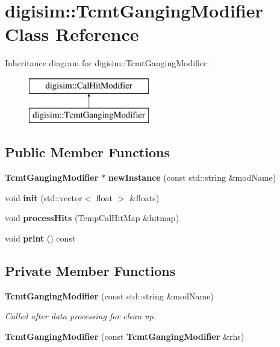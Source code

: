 \section{digisim\-:\-:Tcmt\-Ganging\-Modifier Class Reference}
\label{classdigisim_1_1TcmtGangingModifier}
Inheritance diagram for digisim\-:\-:Tcmt\-Ganging\-Modifier\-:\begin{figure}[H]
\begin{center}
\leavevmode
\includegraphics[height=2.000000cm]{classdigisim_1_1TcmtGangingModifier}
\end{center}
\end{figure}
\subsection*{Public Member Functions}
\begin{DoxyCompactItemize}
\item 
{\bf Tcmt\-Ganging\-Modifier} $\ast$ {\bfseries new\-Instance} (const std\-::string \&mod\-Name)\label{classdigisim_1_1TcmtGangingModifier_aca7031b84d348b2886405a8df0afddd4}

\item 
void {\bfseries init} (std\-::vector$<$ float $>$ \&floats)\label{classdigisim_1_1TcmtGangingModifier_a6d8d930b887ed576ce520f77e57a37d6}

\item 
void {\bfseries process\-Hits} (Temp\-Cal\-Hit\-Map \&hitmap)\label{classdigisim_1_1TcmtGangingModifier_afe4c5cdff1af6d08a62e3922d6be774c}

\item 
void {\bfseries print} () const \label{classdigisim_1_1TcmtGangingModifier_ac0ad1555a9bb4508ccdb07452507fee3}

\end{DoxyCompactItemize}
\subsection*{Private Member Functions}
\begin{DoxyCompactItemize}
\item 
{\bf Tcmt\-Ganging\-Modifier} (const std\-::string \&mod\-Name)\label{classdigisim_1_1TcmtGangingModifier_a227a5c12000f9b5a6342c3b65c4870e9}

\begin{DoxyCompactList}\small\item\em Called after data processing for clean up. \end{DoxyCompactList}\item 
{\bfseries Tcmt\-Ganging\-Modifier} (const {\bf Tcmt\-Ganging\-Modifier} \&rhs)\label{classdigisim_1_1TcmtGangingModifier_a3d2dc1562cdf7ebb894b6ec3b1aeb396}

\end{DoxyCompactItemize}
